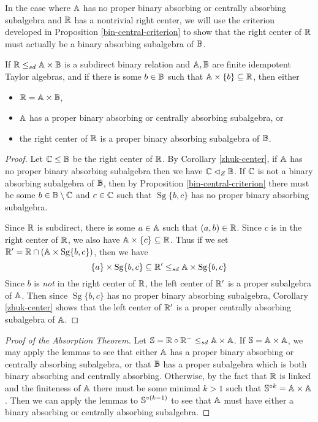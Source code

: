 \documentclass[letterpaper,11pt]{article}
\DeclareMathOperator{\Sg}{Sg}
\begin{document}
In the case where $\mathbb{A}$ has no proper binary absorbing or centrally absorbing subalgebra and $\mathbb{R}$ has a nontrivial right center, we will use the criterion developed in Proposition \ref{bin-central-criterion} to show that the right center of $\mathbb{R}$ must actually be a binary absorbing subalgebra of $\mathbb{B}$.

\begin{lem} If $\mathbb{R} \le_{sd} \mathbb{A} \times \mathbb{B}$ is a subdirect binary relation and $\mathbb{A},\mathbb{B}$ are finite idempotent Taylor algebras, and if there is some $b \in \mathbb{B}$ such that $\mathbb{A} \times \{b\} \subseteq \mathbb{R}$, then either
\begin{itemize}
\item $\mathbb{R} = \mathbb{A} \times \mathbb{B}$,
\item $\mathbb{A}$ has a proper binary absorbing or centrally absorbing subalgebra, or
\item the right center of $\mathbb{R}$ is a proper binary absorbing subalgebra of $\mathbb{B}$.
\end{itemize}
\end{lem}
\begin{proof} Let $\mathbb{C} \le \mathbb{B}$ be the right center of $\mathbb{R}$. By Corollary \ref{zhuk-center}, if $\mathbb{A}$ has no proper binary absorbing subalgebra then we have $\mathbb{C} \lhd_Z \mathbb{B}$. If $\mathbb{C}$ is not a binary absorbing subalgebra of $\mathbb{B}$, then by Proposition \ref{bin-central-criterion} there must be some $b \in \mathbb{B}\setminus \mathbb{C}$ and $c \in \mathbb{C}$ such that $\Sg\{b,c\}$ has no proper binary absorbing subalgebra.

Since $\mathbb{R}$ is subdirect, there is some $a \in \mathbb{A}$ such that $(a,b) \in \mathbb{R}$. Since $c$ is in the right center of $\mathbb{R}$, we also have $\mathbb{A} \times \{c\} \subseteq \mathbb{R}$. Thus if we set $\RR' = \RR \cap (\bA \times \Sg\{b,c\})$, then we have
\[
\{a\} \times \Sg\{b,c\} \subseteq \RR' \le_{sd} \bA \times \Sg\{b,c\}
\]
Since $b$ is \emph{not} in the right center of $\mathbb{R}$, the left center of $\mathbb{R}'$ is a proper subalgebra of $\mathbb{A}$. Then since $\Sg\{b,c\}$ has no proper binary absorbing subalgebra, Corollary \ref{zhuk-center} shows that the left center of $\mathbb{R}'$ is a proper centrally absorbing subalgebra of $\mathbb{A}$.
\end{proof}

\begin{proof}[Proof of the Absorption Theorem] Let $\mathbb{S} = \mathbb{R} \circ \mathbb{R}^- \le_{sd} \mathbb{A} \times \mathbb{A}$. If $\mathbb{S} = \mathbb{A} \times \mathbb{A}$, we may apply the lemmas to see that either $\mathbb{A}$ has a proper binary absorbing or centrally absorbing subalgebra, or that $\mathbb{B}$ has a proper subalgebra which is both binary absorbing and centrally absorbing. Otherwise, by the fact that $\mathbb{R}$ is linked and the finiteness of $\mathbb{A}$ there must be some minimal $k > 1$ such that $\mathbb{S}^{\circ k} = \mathbb{A}\times \mathbb{A}$. Then we can apply the lemmas to $\mathbb{S}^{\circ(k-1)}$ to see that $\mathbb{A}$ must have either a binary absorbing or centrally absorbing subalgebra.
\end{proof}
\end{document}
